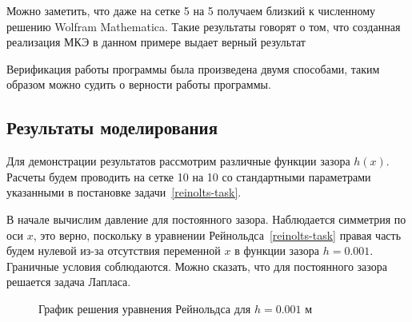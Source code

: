 \documentclass[a4paper,14pt]{extarticle}
\begin{document}
Можно заметить, что даже на сетке 5 на 5 получаем близкий к численному решению Wolfram Mathematica. Такие результаты говорят о том, что созданная реализация МКЭ в данном примере выдает верный результат

Верификация работы программы была произведена двумя способами, таким образом можно судить о верности работы программы.

\subsection{Результаты моделирования}

Для демонстрации результатов рассмотрим различные функции зазора $h(x)$.  Расчеты будем проводить на сетке 10 на 10 со стандартными параметрами указанными в постановке задачи~\eqref{reinolts-task}.

В начале вычислим давление для постоянного зазора. Наблюдается симметрия по оси $x$, это верно, поскольку в уравнении Рейнольдса~\eqref{reinolts-task} правая часть будем нулевой из-за отсутствия переменной $x$ в функции зазора $h = 0.001$. Граничные условия соблюдаются. Можно сказать, что для постоянного зазора решается задача Лапласа.
\begin{figure}[!htbp]
	\caption{График решения уравнения Рейнольдса для $h = 0.001$ м}
	\label{res_static}
\end{figure}
\end{document}
